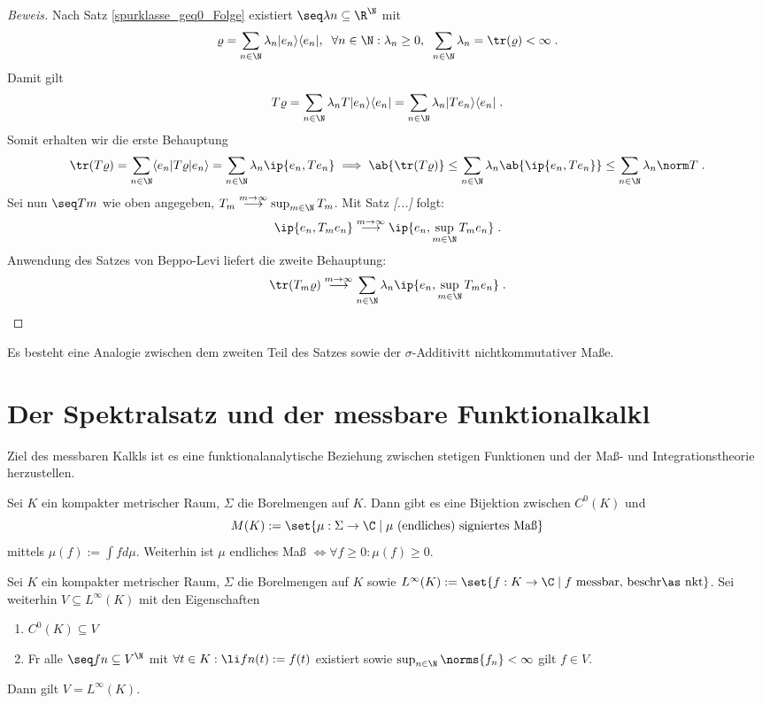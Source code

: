 \begin{proof}[Beweis]
	Nach Satz \ref{spurklasse_geq0_Folge} existiert \(\seq \lambda n \subseteq \R^\N\) mit 
	\[\varrho = \sum_{n\in\N} \lambda_n | e_n \rangle \langle e_n |, \;\; \forall n\in\N: \lambda_n \geq 0, \;\;\sum_{n\in\N} \lambda_n = \tr(\varrho) < \infty\;.\]
	Damit gilt
	\[T\varrho = \sum_{n\in\N} \lambda_n T | e_n \rangle \langle e_n | = \sum_{n\in\N} \lambda_n | Te_n \rangle \langle e_n | \;.\]
	Somit erhalten wir die erste Behauptung
	\[\tr(T\varrho) = \sum_{n\in\N} \langle e_n | T\varrho | e_n \rangle = \sum_{n\in\N} \lambda_n \ip{e_n, Te_n} \implies \ab{\tr(T\varrho)} \leq \sum_{n\in\N} \lambda_n \ab{\ip{e_n, Te_n}} \leq \sum_{n\in\N} \lambda_n\norm T\;.\]
	Sei nun \(\seq Tm\) wie oben angegeben, \(T_m \overset{m\to\infty}{\longrightarrow} \sup_{m\in\N}T_m\). Mit Satz \textit{[...]} folgt:
	\[\ip{e_n, T_m e_n} \overset{m\to\infty}{\longrightarrow} \ip{e_n, \sup_{m\in\N} T_m e_n}\;.\]
	Anwendung des Satzes von Beppo-Levi liefert die zweite Behauptung:
	\[\tr(T_m\varrho)\overset{m\to\infty}{\longrightarrow}  \sum_{n\in\N} \lambda_n\ip{e_n, \sup_{m\in\N} T_m e_n}\;.\]
\end{proof}
\begin{rem}
	Es besteht eine Analogie zwischen dem zweiten Teil des Satzes sowie der $\sigma$-Additivit\as t nichtkommutativer Ma\ss{}e. 
\end{rem}

\section{Der Spektralsatz und der messbare Funktionalkalk\us l}
\begin{rem}
	Ziel des messbaren Kalk\us ls ist es eine funktionalanalytische Beziehung zwischen stetigen Funktionen und der Ma\ss{}- und Integrationstheorie herzustellen.
\end{rem}

\begin{theorem}
	Sei $K$ ein kompakter metrischer Raum, $\Sigma$ die Borelmengen auf $K$. Dann gibt es eine Bijektion zwischen $C^0(K)$ und 
	\[M(K) := \set{\mu:\Sigma \to \C\;\vert\; \mu \text{ (endliches) signiertes Ma\ss{}}}\]
	mittels \(\mu(f):= \int f d\mu\). Weiterhin ist $\mu$ endliches Ma\ss{} \(\iff \forall f \geq 0 : \mu(f) \geq 0\).
\end{theorem}

\begin{theorem}
	Sei $K$ ein kompakter metrischer Raum, $\Sigma$ die Borelmengen auf $K$ sowie \(L^\infty(K):= \set{f: K\to\C\;\vert\; f \text{ messbar, beschr\as nkt}}\). Sei weiterhin \(V\subseteq L^\infty(K)\) mit den Eigenschaften \label{lemma_mess_kalk}
	\begin{enumerate}
		\item \(C^0(K)\subseteq V\)
		\item F\us r alle \(\seq fn \subseteq V^\N\) mit \(\forall t \in K: \li fn(t) := f(t)\) existiert sowie  \(\sup_{n\in\N}\norms{f_n} < \infty\) gilt \(f\in V\). \label{lemma_mess_kalk_2}
	\end{enumerate}
	Dann gilt \(V = L^\infty(K)\).
\end{theorem}

